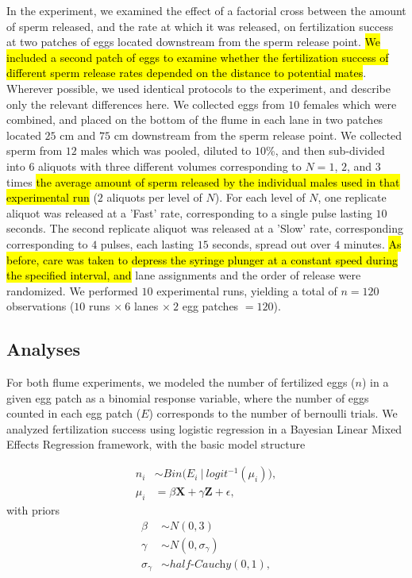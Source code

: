 \documentclass{article}
\begin{document}
	In the  experiment, we examined the effect of a factorial cross between the amount of sperm released, and the rate at which it was released, on fertilization success at two patches of eggs located downstream from the sperm release point. \hl{We included a second patch of eggs to examine whether the fertilization success of different sperm release rates depended on the distance to potential mates}. Wherever possible, we used identical protocols to the  experiment, and describe only the relevant differences here. We collected eggs from $10$ females which were combined, and placed on the bottom of the flume in each lane in two patches located $25$ cm and $75$ cm downstream from the sperm release point. We collected sperm from $12$ males which was pooled, diluted to $10$\%, and then sub-divided into $6$ aliquots with three different volumes corresponding to $N = 1$, $2$, and $3$ times \hl{the average amount of sperm released by the individual males used in that experimental run} ($2$ aliquots per level of $N$). For each level of $N$, one replicate aliquot was released at a 'Fast' rate, corresponding to a single pulse lasting $10$ seconds. The second replicate aliquot was released at a 'Slow' rate, corresponding corresponding to $4$ pulses, each lasting $15$ seconds, spread out over $4$ minutes. \hl{As before, care was taken to depress the syringe plunger at a constant speed during the specified interval, and} lane assignments and the order of release were randomized. We performed $10$ experimental runs, yielding a total of $n=120$ observations ($10$ runs $\times~6$ lanes $\times~2$ egg patches $= 120$).

	\subsection*{Analyses}
	For both flume experiments, we modeled the number of fertilized eggs ($n$) in a given egg patch as a binomial response variable, where the number of eggs counted in each egg patch ($E$) corresponds to the number of bernoulli trials. We analyzed fertilization success using logistic regression in a Bayesian Linear Mixed Effects Regression framework, with the basic model structure 

\begin{align*}
	n_i   &\sim Bin\Big(E_i~|~logit^{-1}(\mu_i)\Big), \\
	\mu_i &= \beta \mathbf{X} + \gamma \mathbf{Z} + \epsilon,
\end{align*}
\noindent{} with priors
\begin{align*}
	\beta           &\sim N(0,3) \\
	\gamma          &\sim N(0,\sigma_{\gamma}) \\
	\sigma_{\gamma} &\sim \mathit{half} \text{-}\textit{Cauchy}(0,1),
\end{align*}
\end{document}
